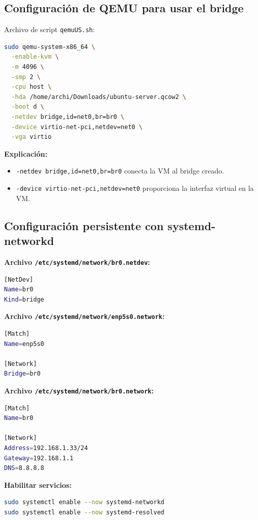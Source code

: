 \documentclass[12pt, a4paper]{article}
\begin{document}
\subsection{Configuración de QEMU para usar el bridge}

Archivo de script \texttt{qemuUS.sh}:

\begin{lstlisting}[language=bash, caption=Script para lanzar VM con QEMU usando br0]
sudo qemu-system-x86_64 \
  -enable-kvm \
  -m 4096 \
  -smp 2 \
  -cpu host \
  -hda /home/archi/Downloads/ubuntu-server.qcow2 \
  -boot d \
  -netdev bridge,id=net0,br=br0 \
  -device virtio-net-pci,netdev=net0 \
  -vga virtio
\end{lstlisting}

\textbf{Explicación:}
\begin{itemize}
    \item \texttt{-netdev bridge,id=net0,br=br0} conecta la VM al bridge creado.
    \item \texttt{-device virtio-net-pci,netdev=net0} proporciona la interfaz virtual en la VM.
\end{itemize}
\newpage
\subsection{Configuración persistente con systemd-networkd}

\textbf{Archivo \texttt{/etc/systemd/network/br0.netdev}:}
\begin{lstlisting}[language=bash]
[NetDev]
Name=br0
Kind=bridge
\end{lstlisting}

\textbf{Archivo \texttt{/etc/systemd/network/enp5s0.network}:}
\begin{lstlisting}[language=bash]
[Match]
Name=enp5s0

[Network]
Bridge=br0
\end{lstlisting}

\textbf{Archivo \texttt{/etc/systemd/network/br0.network}:}
\begin{lstlisting}[language=bash]
[Match]
Name=br0

[Network]
Address=192.168.1.33/24
Gateway=192.168.1.1
DNS=8.8.8.8
\end{lstlisting}

\textbf{Habilitar servicios:}
\begin{lstlisting}[language=bash]
sudo systemctl enable --now systemd-networkd
sudo systemctl enable --now systemd-resolved
\end{lstlisting}
\newpage
\end{document}
